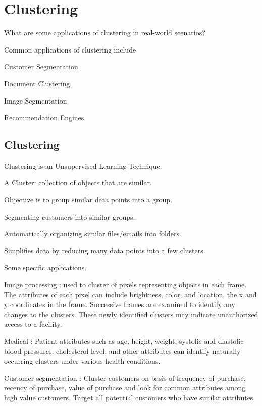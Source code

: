 	\chapter{Clustering} 	\resetquestioncounter{}
	\begin{qanda}
		\begin{question}
What are some applications of clustering in real-world scenarios?
		\end{question}

		\begin{answer}
Common applications of clustering include
	\begin{bulletedlist}
		\item Customer Segmentation
		\item Document Clustering
		\item Image Segmentation
		\item Recommendation Engines\end{bulletedlist}\end{answer}\end{qanda}



	\section{Clustering}
	\begin{bulletedlist}
		\item Clustering is an Unsupervised Learning Technique.
		\item A Cluster: collection of objects that are similar.
		\item Objective is to group similar data points into a group.
		\begin{bulletedlist}
			\item Segmenting customers into similar groups.
			\item Automatically organizing similar files/emails into folders.
		\end{bulletedlist}
		\item Simplifies data by reducing many data points into a few clusters.
		\item Some specific applications.
		\begin{bulletedlist}
			\item Image processing : used to cluster of pixels representing objects in each frame. The attributes of each pixel can include brightness, color, and location, the x and y
coordinates in the frame. Successive frames are examined to identify any changes to the clusters. These newly identified clusters may indicate unauthorized access to a facility.
			\item Medical : Patient attributes such as age, height, weight, systolic and diastolic blood pressures, cholesterol level, and other attributes can identify naturally occurring clusters under various health conditions.
			\item Customer segmentation : Cluster customers on basis of frequency of purchase, recency of purchase, value of purchase and look for common attributes among high value customers. Target all potential customers who have similar attributes.
		\end{bulletedlist}
	\end{bulletedlist}


